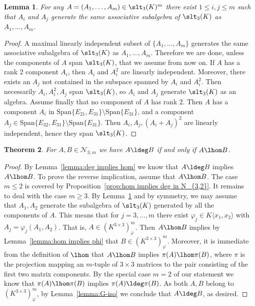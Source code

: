 \documentclass[12pt]{amsart}
\newtheorem{theorem}{\bf Theorem}[section]
\newtheorem{lemma}[theorem]{\bf Lemma}
\newcommand{\field}{K}
\begin{document}
\begin{lemma} \label{lemma:2 generators}
For any $A=(A_1,\dots,A_m)\in \slt_3(\field)^m$ there exist 
$1\le i,j\le m$ such that $A_i$ and $A_j$ generate 
the same associative subalgebra of $\slt_3(\field)$ as $A_1,\dots,A_m$. 
\end{lemma} 

\begin{proof}
A maximal linearly independent subset of $\{A_1,\dots,A_m\}$ generates the same associative subalgebra of 
$\slt_3(\field)$ as $A_1,\dots,A_m$. Therefore we are done, unless the components of $A$ span 
$\slt_3(\field)$, that we assume from now on. If $A$ has a rank $2$ component $A_i$, then 
$A_i$ and $A_i^2$ are linearly independent. Moreover, there exists an $A_j$ not contained in 
the subspace spanned by $A_i$ and $A_i^2$. Then necessarily $A_i, A_i^2,A_j$ span 
$\slt_3(\field)$, so $A_i$ and $A_j$ generate $\slt_3(\field)$ as an algebra. 
Assume finally that no component of $A$ has rank $2$. Then $A$ has a component $A_i$ in 
$\mathrm{Span}\{E_{21},E_{31}\}\setminus\mathrm{Span}\{E_{31}\}$, and a component 
$A_j\in \mathrm{Span}\{E_{32},E_{31}\}\setminus\mathrm{Span}\{E_{31}\}$. 
Then $A_i,A_j,(A_i+A_j)^2$ are linearly independent, hence they span $\slt_3(\field)$. 
\end{proof}

\begin{theorem}
    For $A,B\in \mathcal{N}_{3,m}$ we have $A\ldeg B$ if and only if 
    $A\lhom B$. 
\end{theorem}

\begin{proof} 
By Lemma~\ref{lemma:deg implies hom} we know that $A\ldeg B$ implies $A\lhom B$. 
To prove the reverse implication, assume that $A\lhom B$. 
The case $m\le 2$ is covered by Proposition~\ref{prop:hom implies deg in N_{3,2}}. 
It remains to deal with the case $m\ge 3$. By Lemma~\ref{lemma:2 generators} and by symmetry,  
we may assume that $A_1,A_2$ generate the subalgebra of $\slt_3(\field)$ generated by all the components of $A$. 
This means that for $j=3,\dots,m$ there exist $\varphi_j\in \field\langle x_1,x_2\rangle$ with 
$A_j=\varphi_j(A_1,A_2)$. That is, $A\in (\field^{3\times 3})^m_\varphi$. 
Then $A\lhom B$ implies by Lemma~\ref{lemma:hom implies phi} that $B\in (\field^{3\times 3})^m_\varphi$. 
Moreover, it is immediate from the definition of $\lhom$ that $A\lhom B$ implies $\pi(A)\lhom \pi(B)$, where 
$\pi$ is the projection mapping an $m$-tuple of $3\times 3$ matrices to the pair consisting of the first two matrix 
components. By the special case $m=2$ of our statement we know that $\pi(A)\lhom \pi(B)$ implies 
$\pi(A)\ldeg \pi(B)$. As both $A,B$ belong to $(\field^{3\times 3})^m_\varphi$, by Lemma~\ref{lemma:G-iso} we conclude 
that $A\ldeg B$, as desired. 
\end{proof}
\end{document}
